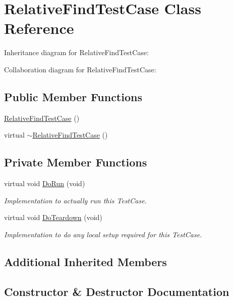 \hypertarget{classRelativeFindTestCase}{}\section{Relative\+Find\+Test\+Case Class Reference}
\label{classRelativeFindTestCase}


Inheritance diagram for Relative\+Find\+Test\+Case\+:


Collaboration diagram for Relative\+Find\+Test\+Case\+:
\subsection*{Public Member Functions}
\begin{DoxyCompactItemize}
\item 
\hyperlink{classRelativeFindTestCase_a733946fa449db023d06f05bcb9d2ee0b}{Relative\+Find\+Test\+Case} ()
\item 
virtual \hyperlink{classRelativeFindTestCase_ac3f806632f8ecad5e767bb6f5a43c7c7}{$\sim$\+Relative\+Find\+Test\+Case} ()
\end{DoxyCompactItemize}
\subsection*{Private Member Functions}
\begin{DoxyCompactItemize}
\item 
virtual void \hyperlink{classRelativeFindTestCase_a95fa1d7d566cd7745a6a3302e6748311}{Do\+Run} (void)
\begin{DoxyCompactList}\small\item\em Implementation to actually run this Test\+Case. \end{DoxyCompactList}\item 
virtual void \hyperlink{classRelativeFindTestCase_a21ac2e8961bef0bb257b43bb9aea37d7}{Do\+Teardown} (void)
\begin{DoxyCompactList}\small\item\em Implementation to do any local setup required for this Test\+Case. \end{DoxyCompactList}\end{DoxyCompactItemize}
\subsection*{Additional Inherited Members}


\subsection{Constructor \& Destructor Documentation}
